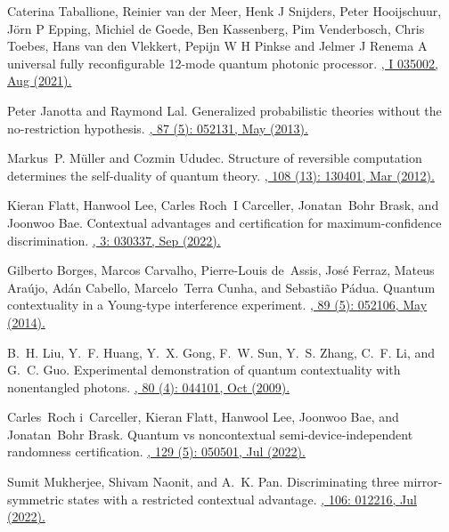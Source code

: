 \documentclass[a4paper,twocolumn,11pt,accepted=2024-01-17]{quantumarticle}
\begin{document}
\begin{thebibliography}{100}
Caterina Taballione, Reinier van der Meer, Henk J Snijders, Peter Hooijschuur, Jörn P Epping, Michiel de Goede, Ben Kassenberg, Pim Venderbosch, Chris Toebes, Hans van den Vlekkert, Pepijn W H Pinkse and Jelmer J Renema
\newblock A universal fully reconfigurable 12-mode quantum photonic processor.
\href{http://dx.doi.org/10.1088/2633-4356/ac168c}{, I 035002, Aug (2021).}

Peter Janotta and Raymond Lal.
\newblock Generalized probabilistic theories without the no-restriction
  hypothesis.
\href{https://doi.org/10.1103/PhysRevA.87.052131}{, 87 (5): 052131, May (2013).}

Markus~P. M{\"u}ller and Cozmin Ududec.
\newblock Structure of reversible computation determines the self-duality of
  quantum theory.
\href{https://doi.org/10.1103/PhysRevLett.108.130401}{, 108 (13): 130401, Mar (2012).}

Kieran Flatt, Hanwool Lee, Carles Roch~I Carceller, Jonatan~Bohr Brask, and
  Joonwoo Bae.
\newblock Contextual advantages and certification for maximum-confidence
  discrimination.
\href{https://doi.org/10.1103/PRXQuantum.3.030337}{, 3: 030337, Sep (2022).}

Gilberto Borges, Marcos Carvalho, Pierre-Louis de~Assis, Jos{\'{e}} Ferraz,
  Mateus Ara{\'{u}}jo, Ad{\'{a}}n Cabello, Marcelo~Terra Cunha, and
  Sebasti{\~{a}}o P{\'{a}}dua.
\newblock Quantum contextuality in a {Y}oung-type interference experiment.
\href{https://doi.org/10.1103/PhysRevA.89.052106}{, 89 (5): 052106, May (2014).}

B.~H. Liu, Y.~F. Huang, Y.~X. Gong, F.~W. Sun, Y.~S. Zhang, C.~F. Li, and G.~C.
  Guo.
\newblock Experimental demonstration of quantum contextuality with nonentangled
  photons.
\href{https://doi.org/10.1103/PhysRevA.80.044101}{, 80 (4): 044101, Oct (2009).}

Carles~Roch i~Carceller, Kieran Flatt, Hanwool Lee, Joonwoo Bae, and
  Jonatan~Bohr Brask.
\newblock Quantum vs noncontextual semi-device-independent randomness
  certification.
\href{https://doi.org/10.1103/PhysRevLett.129.050501}{, 129 (5): 050501, Jul (2022).}

Sumit Mukherjee, Shivam Naonit, and A.~K. Pan.
\newblock Discriminating three mirror-symmetric states with a restricted contextual advantage.
\href{https://doi.org/10.1103/PhysRevA.106.012216}{, 106: 012216, Jul (2022).}

\end{thebibliography}
\end{document}

